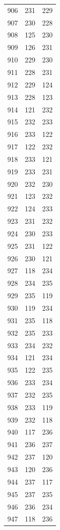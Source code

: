 \documentclass[a4paper,11pt]{article}
\begin{document}
\begin{center}
\begin{longtable}{|R{1.5cm}|R{1.5cm}|R{1.5cm}|}
  906 &  231 &  229 \\
  907 &  230 &  228 \\
  908 &  125 &  230 \\
  909 &  126 &  231 \\
  910 &  229 &  230 \\
  911 &  228 &  231 \\
  912 &  229 &  124 \\
  913 &  228 &  123 \\
  914 &  121 &  232 \\
  915 &  232 &  233 \\
  916 &  233 &  122 \\
  917 &  122 &  232 \\
  918 &  233 &  121 \\
  919 &  233 &  231 \\
  920 &  232 &  230 \\
  921 &  123 &  232 \\
  922 &  124 &  233 \\
  923 &  231 &  232 \\
  924 &  230 &  233 \\
  925 &  231 &  122 \\
  926 &  230 &  121 \\
  927 &  118 &  234 \\
  928 &  234 &  235 \\
  929 &  235 &  119 \\
  930 &  119 &  234 \\
  931 &  235 &  118 \\
  932 &  235 &  233 \\
  933 &  234 &  232 \\
  934 &  121 &  234 \\
  935 &  122 &  235 \\
  936 &  233 &  234 \\
  937 &  232 &  235 \\
  938 &  233 &  119 \\
  939 &  232 &  118 \\
  940 &  117 &  236 \\
  941 &  236 &  237 \\
  942 &  237 &  120 \\
  943 &  120 &  236 \\
  944 &  237 &  117 \\
  945 &  237 &  235 \\
  946 &  236 &  234 \\
  947 &  118 &  236 \\

\end{longtable}
\end{center}
\end{document}
